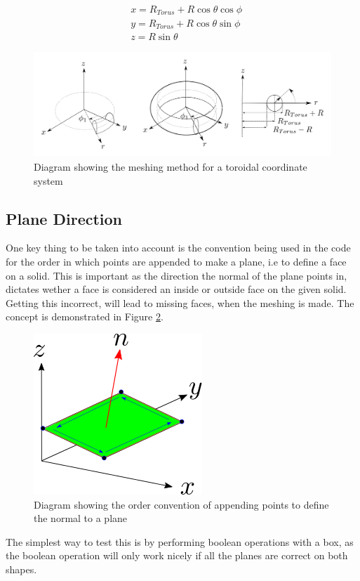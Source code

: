 \documentclass[12pt,a4paper]{article}
\begin{document}
\begin{equation}
\begin{aligned}
& x = R_{Torus} + R\cos{\theta}\cos{\phi} \\
& y = R_{Torus} + R\cos{\theta}\sin{\phi} \\
& z =  R\sin{\theta} 
\end{aligned}
\end{equation}

\begin{figure}[h!]
\centering
\includegraphics[scale=0.35]{Images//Coords/torus_coords.png}
\caption[width=\columnwidth]{Diagram showing the meshing method for a toroidal coordinate system}
\label{tormeshin}
\end{figure}

\subsection{Plane Direction}
One key thing to be taken into account is the convention being used in the code for the order in which points are appended to make a plane, i.e to define a face on a solid. This is important as the direction the normal of the plane points in, dictates wether a face is considered an inside or outside face on the given solid. Getting this incorrect, will lead to missing faces, when the meshing is made. The concept is demonstrated in Figure \ref{pointsorder}.

\begin{figure}[h!]
\centering
\includegraphics[scale=0.75]{Images//append_points//Point_Appending_Order.png}
\caption[width=\columnwidth]{Diagram showing the order convention of appending points to define the normal to a plane}
\label{pointsorder}
\end{figure}
\noindent The simplest way to test this is by performing boolean operations with a box, as the boolean operation will only work nicely if all the planes are correct on both shapes.
\end{document}
